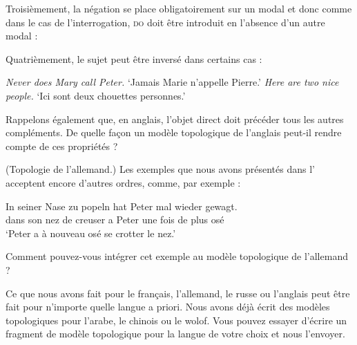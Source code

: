{    \begin{exe}
    \begin{xlista}
    \end{xlista}
    \end{exe}
    
    Troisièmement, la négation se place obligatoirement sur un modal et donc comme dans le cas de l’interrogation, \textsc{do} doit être introduit en l’absence d’un autre modal :
    
    \begin{exe}
    \begin{xlista}
    \end{xlista}
    \end{exe}

    Quatrièmement, le sujet peut être inversé dans certains cas :
    
    \begin{exe}
    \begin{xlista}
    \ex  \textit{Never does Mary call Peter.}   ‘Jamais Marie n’appelle Pierre.’
    \ex  \textit{Here are two nice people.}     ‘Ici sont deux chouettes personnes.’
    \end{xlista}
    \end{exe}
    Rappelons également que, en anglais, l’objet direct doit précéder tous les autres compléments. De quelle façon un modèle topologique de l’anglais peut-il rendre compte de ces propriétés ?

     (Topologie de l’allemand.) Les exemples que nous avons présentés dans l’ acceptent encore d’autres ordres, comme, par exemple :

    \begin{exe}
    \sn
    \gll In seiner Nase zu popeln hat Peter {mal wieder} gewagt.\\
         dans son nez  de creuser  a   Peter   {une fois de plus}   osé\\
    \glt   ‘Peter a à nouveau osé se crotter le nez.’
    \end{exe}
  Comment pouvez-vous intégrer cet exemple au modèle topologique de l’allemand ?

     Ce que nous avons fait pour le français, l’allemand, le russe ou l’anglais peut être fait pour n’importe quelle langue a priori. Nous avons déjà écrit des modèles topologiques pour l’arabe, le chinois ou le wolof. Vous pouvez essayer d’écrire un fragment de modèle topologique pour la langue de votre choix et nous l’envoyer.
}
